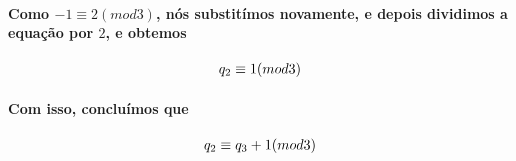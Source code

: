 \paragraph{
Como $-1 \equiv 2 (mod 3)$, n\'os substit\'imos novamente, e depois dividimos a equa\c{c}\~ao por $2$, e obtemos
}
\[	
	\begin{array}{c}
		\textit{$ q_2  \equiv 1 (mod 3)$}
	\end{array}
\]
\paragraph{
Com isso, conclu\'imos que
}
\[	
	\begin{array}{c}
		\textit{$ q_2  \equiv q_3 + 1 (mod 3)$}
	\end{array}
\]
